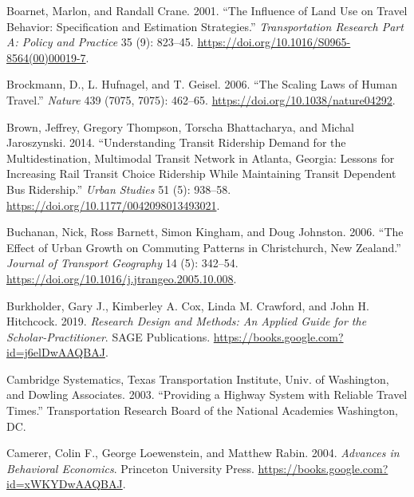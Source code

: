 \documentclass[
  12pt,
]{article}
\newlength{\cslhangindent}
\newlength{\cslentryspacingunit} %
\newenvironment{CSLReferences}[2] %
 {%
  \setlength{\parindent}{0pt}
  \ifodd #1
  \let\oldpar\par
  \def\par{\hangindent=\cslhangindent\oldpar}
  \fi
  \setlength{\parskip}{#2\cslentryspacingunit}
 }%
 {}
\begin{document}
\begin{CSLReferences}{1}{0}
\leavevmode{}%
Boarnet, Marlon, and Randall Crane. 2001. {``The Influence of Land Use on Travel Behavior: Specification and Estimation Strategies.''} \emph{Transportation Research Part A: Policy and Practice} 35 (9): 823--45. \url{https://doi.org/10.1016/S0965-8564(00)00019-7}.

\leavevmode{}%
Brockmann, D., L. Hufnagel, and T. Geisel. 2006. {``The Scaling Laws of Human Travel.''} \emph{Nature} 439 (7075, 7075): 462--65. \url{https://doi.org/10.1038/nature04292}.

\leavevmode{}%
Brown, Jeffrey, Gregory Thompson, Torscha Bhattacharya, and Michal Jaroszynski. 2014. {``Understanding {Transit Ridership Demand} for the {Multidestination}, {Multimodal Transit Network} in {Atlanta}, {Georgia}: {Lessons} for {Increasing Rail Transit Choice Ridership} While {Maintaining Transit Dependent Bus Ridership}.''} \emph{Urban Studies} 51 (5): 938--58. \url{https://doi.org/10.1177/0042098013493021}.

\leavevmode{}%
Buchanan, Nick, Ross Barnett, Simon Kingham, and Doug Johnston. 2006. {``The Effect of Urban Growth on Commuting Patterns in {Christchurch}, {New Zealand}.''} \emph{Journal of Transport Geography} 14 (5): 342--54. \url{https://doi.org/10.1016/j.jtrangeo.2005.10.008}.

\leavevmode{}%
Burkholder, Gary J., Kimberley A. Cox, Linda M. Crawford, and John H. Hitchcock. 2019. \emph{Research {Design} and {Methods}: {An Applied Guide} for the {Scholar-Practitioner}}. {SAGE Publications}. \url{https://books.google.com?id=j6elDwAAQBAJ}.

\leavevmode{}%
Cambridge Systematics, Texas Transportation Institute, Univ. of Washington, and Dowling Associates. 2003. {``Providing a Highway System with Reliable Travel Times.''} Transportation Research Board of the National Academies Washington, DC.

\leavevmode{}%
Camerer, Colin F., George Loewenstein, and Matthew Rabin. 2004. \emph{Advances in {Behavioral Economics}}. {Princeton University Press}. \url{https://books.google.com?id=xWKYDwAAQBAJ}.


\end{CSLReferences}
\end{document}
